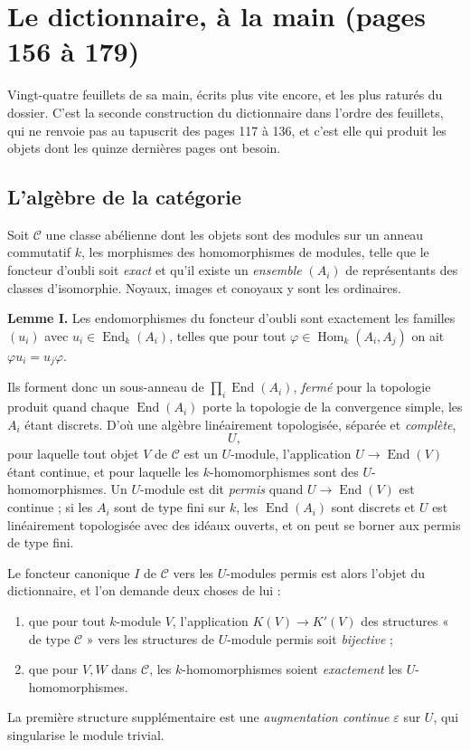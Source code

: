 \documentclass[11pt,a4paper]{article}
\begin{document}
\section*{Le dictionnaire, à la main (pages 156 à 179)}

Vingt-quatre feuillets de sa main, écrits plus vite encore, et les plus raturés
du dossier. C'est la seconde construction du dictionnaire dans l'ordre des
feuillets, qui ne renvoie pas au tapuscrit des pages 117 à 136, et c'est elle
qui produit les objets dont les quinze dernières pages ont besoin.

\subsection*{L'algèbre de la catégorie}

Soit $\mathcal{C}$ une classe abélienne dont les objets sont des modules sur un
anneau commutatif $k$, les morphismes des homomorphismes de modules, telle que
le foncteur d'oubli soit \emph{exact} et qu'il existe un \emph{ensemble}
$(A_{i})$ de représentants des classes d'isomorphie. Noyaux, images et conoyaux
y sont les ordinaires.

\textbf{Lemme I.} Les endomorphismes du foncteur d'oubli sont exactement les
familles $(u_{i})$ avec $u_{i} \in \operatorname{End}_{k}(A_{i})$, telles que
pour tout $\varphi \in \operatorname{Hom}_{k}(A_{i}, A_{j})$ on ait
$\varphi u_{i} = u_{j}\varphi$.

Ils forment donc un sous-anneau de $\prod_{i}\operatorname{End}(A_{i})$,
\emph{fermé} pour la topologie produit quand chaque
$\operatorname{End}(A_{i})$ porte la topologie de la convergence simple, les
$A_{i}$ étant discrets. D'où une algèbre linéairement topologisée, séparée et
\emph{complète},
\[
U ,
\]
pour laquelle tout objet $V$ de $\mathcal{C}$ est un $U$-module, l'application
$U \to \operatorname{End}(V)$ étant continue, et pour laquelle les
$k$-homomorphismes sont des $U$-homomorphismes. Un $U$-module est dit
\emph{permis} quand $U \to \operatorname{End}(V)$ est continue ; si les $A_{i}$
sont de type fini sur $k$, les $\operatorname{End}(A_{i})$ sont discrets et $U$
est linéairement topologisée avec des idéaux ouverts, et on peut se borner aux
permis de type fini.

Le foncteur canonique $I$ de $\mathcal{C}$ vers les $U$-modules permis est
alors l'objet du dictionnaire, et l'on demande deux choses de lui :
\begin{enumerate}
\item[$1^{\circ}$)] que pour tout $k$-module $V$, l'application $K(V) \to
K'(V)$ des structures « de type $\mathcal{C}$ » vers les structures de
$U$-module permis soit \emph{bijective} ;
\item[$2^{\circ}$)] que pour $V, W$ dans $\mathcal{C}$, les $k$-homomorphismes
soient \emph{exactement} les $U$-homomorphismes.
\end{enumerate}
La première structure supplémentaire est une \emph{augmentation continue}
$\varepsilon$ sur $U$, qui singularise le module trivial.
\end{document}
